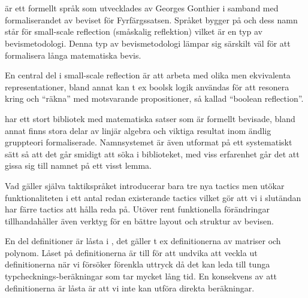\section{\ssr{}}
\ssr{} är ett formellt språk som utvecklades av Georges Gonthier i samband med
formaliserandet av beviset för Fyrfärgssatsen. Språket bygger på \coq{} och dess
namn står för small-scale reflection (småskalig reflektion) vilket är en typ av
bevismetodologi. Denna typ av bevismetodologi lämpar sig särskilt väl för att
formalisera långa matematiska bevis.

En central del i small-scale reflection är att arbeta med olika men ekvivalenta
representationer, bland annat kan t ex boolsk logik användas för att resonera
kring och ``räkna'' med motsvarande propositioner, så kallad ``boolean
reflection''.

\ssr{} har ett stort bibliotek med matematiska satser som är formellt bevisade,
bland annat finns stora delar av linjär algebra och viktiga resultat inom
ändlig gruppteori formaliserade. Namnsystemet är även utformat på ett
systematiskt sätt så att det går smidigt att söka i biblioteket, med viss
erfarenhet går det att gissa sig till namnet på ett visst lemma.

Vad gäller själva taktikspråket introducerar \ssr{} bara tre nya tactics men
utökar funktionaliteten i ett antal redan existerande tactics vilket gör att vi
i slutändan har färre tactics att hålla reda på. Utöver rent funktionella
förändringar tillhandahåller \ssr{} även verktyg för en bättre layout och
struktur av bevisen.

En del definitioner är låsta i \ssr{}, det gäller t ex definitionerna av matriser
och polynom. Låset på definitionerna är till för att undvika att veckla ut
definitionerna när vi försöker förenkla uttryck då det kan leda till tunga
typchecknings-beräkningar som tar mycket lång tid. En konsekvens av att
definitionerna är låsta är att vi inte kan utföra direkta beräkningar.
